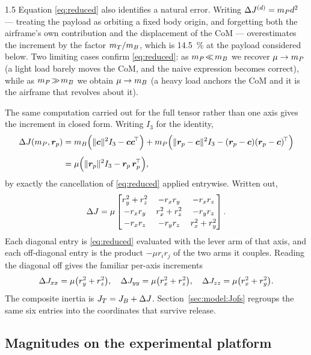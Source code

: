 \begin{spacing}{1.5}
Equation \eqref{eq:reduced} also identifies a natural error. Writing
$\Delta J^{(d)} = m_P d^2$ --- treating the payload as orbiting a fixed body
origin, and forgetting both the airframe's own contribution and the displacement
of the CoM --- overestimates the increment by the factor $m_T / m_B$, which is
\SI{14.5}{\percent} at the payload considered below. Two limiting cases confirm
\eqref{eq:reduced}: as $m_P \!\ll\! m_B$ we recover $\mu \to m_P$ (a light load
barely moves the CoM, and the naive expression becomes correct), while as
$m_P \!\gg\! m_B$ we obtain $\mu \to m_B$ (a heavy load anchors the CoM and it is
the airframe that revolves about it).

The same computation carried out for the full tensor rather than one axis gives
the increment in closed form. Writing $I_3$ for the identity,
\begin{align}
\Delta J(m_P,\bm{r}_p)
&= m_B\Bigl(\lVert\bm{c}\rVert^2 I_3 - \bm{c}\bm{c}^{\!\top}\Bigr)
 + m_P\Bigl(\lVert\bm{r}_p-\bm{c}\rVert^2 I_3 - (\bm{r}_p-\bm{c})(\bm{r}_p-\bm{c})^{\!\top}\Bigr) \nonumber\\[4pt]
&= \mu\Bigl(\lVert\bm{r}_p\rVert^2 I_3 - \bm{r}_p\,\bm{r}_p^{\!\top}\Bigr),
\label{eq:dJfull}
\end{align}
by exactly the cancellation of \eqref{eq:reduced} applied entrywise. Written out,
\begin{equation}
\Delta J = \mu
\begin{bmatrix}
r_y^2 + r_z^2 & -r_x r_y      & -r_x r_z \\[2pt]
-r_x r_y      & r_x^2 + r_z^2 & -r_y r_z \\[2pt]
-r_x r_z      & -r_y r_z      & r_x^2 + r_y^2
\end{bmatrix}.
\label{eq:dJmatrix}
\end{equation}
Each diagonal entry is \eqref{eq:reduced} evaluated with the lever arm of that
axis, and each off-diagonal entry is the product $-\mu r_i r_j$ of the two arms
it couples. Reading the diagonal off gives the familiar per-axis increments
\begin{equation}
\Delta J_{xx} = \mu\bigl(r_y^2 + r_z^2\bigr), \quad
\Delta J_{yy} = \mu\bigl(r_x^2 + r_z^2\bigr), \quad
\Delta J_{zz} = \mu\bigl(r_x^2 + r_y^2\bigr).
\label{eq:djaxes}
\end{equation}
The composite inertia is $J_T=J_B+\Delta J$.
Section~\ref{sec:model:Jofs} regroups the same six entries into the coordinates
that survive release.

\subsection{Magnitudes on the experimental platform}\label{sec:model:magnitudes}


\end{spacing}
